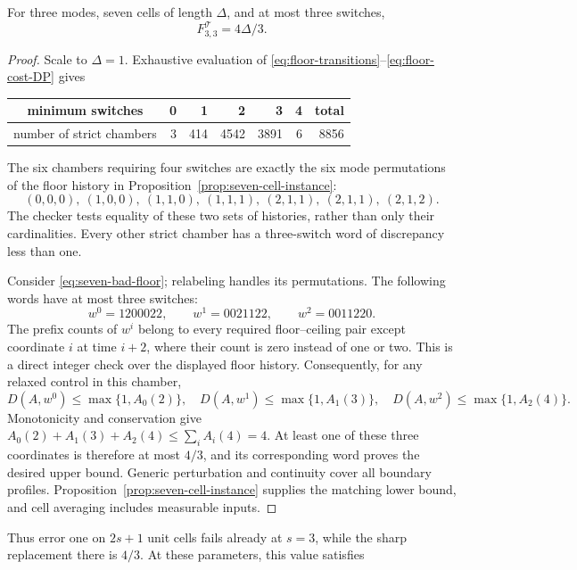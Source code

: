 \begin{theorem}\label{thm:seven-cells}
For three modes, seven cells of length $\Delta$, and at most three switches,
\begin{equation}\label{eq:seven-cells}
 F^{\mathcal T}_{3,3}=4\Delta/3.
\end{equation}
\end{theorem}
\begin{proof}
Scale to $\Delta=1$. Exhaustive evaluation of
\eqref{eq:floor-transitions}--\eqref{eq:floor-cost-DP} gives
\begin{center}
\begin{tabular}{c|rrrrr|r}
minimum switches&0&1&2&3&4&total\\\hline
number of strict chambers&3&414&4542&3891&6&8856
\end{tabular}
\end{center}
The six chambers requiring four switches are exactly the six mode
permutations of the floor history in
Proposition~\ref{prop:seven-cell-instance}:
\begin{equation}\label{eq:seven-bad-floor}
 (0,0,0),\ (1,0,0),\ (1,1,0),\ (1,1,1),\
 (2,1,1),\ (2,1,1),\ (2,1,2).
\end{equation}
The checker tests equality of these two sets of histories, rather than only
their cardinalities. Every other strict chamber has a three-switch word
of discrepancy less than one.

Consider \eqref{eq:seven-bad-floor}; relabeling handles its permutations.
The following words have at most three switches:
\[
 w^0=1200022,\qquad w^1=0021122,\qquad w^2=0011220.
\]
The prefix counts of $w^i$ belong to every required floor--ceiling pair
except coordinate $i$ at time $i+2$, where their count is zero instead
of one or two. This is a direct integer check over the displayed floor
history. Consequently, for any relaxed control in this chamber,
\[
 D(A,w^0)\le\max\{1,A_0(2)\},\quad
 D(A,w^1)\le\max\{1,A_1(3)\},\quad
 D(A,w^2)\le\max\{1,A_2(4)\}.
\]
Monotonicity and conservation give
$A_0(2)+A_1(3)+A_2(4)\le\sum_i A_i(4)=4$.
At least one of these three coordinates is therefore at most $4/3$,
and its corresponding word proves the desired upper bound.
Generic perturbation and continuity cover all boundary profiles.
Proposition~\ref{prop:seven-cell-instance} supplies the matching lower
bound, and cell averaging includes measurable inputs.
\end{proof}
Thus error one on $2s+1$ unit cells fails already at $s=3$, while the
sharp replacement there is $4/3$. At these parameters, this value satisfies
